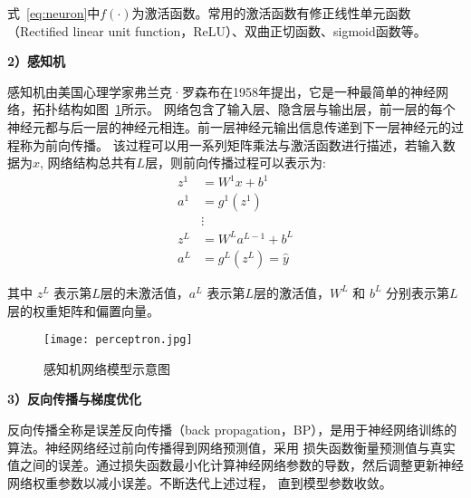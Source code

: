 式~\ref{eq:neuron}中$f(\cdot)$为激活函数。常用的激活函数有修正线性单元函数（Rectified linear unit function，ReLU）、双曲正切函数、sigmoid函数等。

\textbf{2）感知机}

感知机由美国心理学家弗兰克·罗森布\cite{1958perceptron}在1958年提出，它是一种最简单的神经网络，拓扑结构如图~\ref{fig:perceptron}所示。
网络包含了输入层、隐含层与输出层，前一层的每个神经元都与后一层的神经元相连。前一层神经元输出信息传递到下一层神经元的过程称为前向传播。
该过程可以用一系列矩阵乘法与激活函数进行描述，若输入数据为$x$, 网络结构总共有$L$层，则前向传播过程可以表示为:
\begin{equation}
  \begin{aligned}
  z^{1} & =W^{1} x+b^{1} \\
  a^{1} & =g^{1}\left(z^{1}\right) \\
  & \vdots \\
  z^{L} & =W^{L} a^{L-1}+b^{L} \\
  a^{L} & =g^{L}\left(z^{L}\right)=\hat{y}
  \label{eq:perceptron}
\end{aligned}
\end{equation}

其中 $z^{L}$ 表示第$L$层的未激活值，$a^{L}$ 表示第$L$层的激活值，$W^{L}$ 和 $b^{L}$ 分别表示第$L$层的权重矩阵和偏置向量。
\begin{figure}[htbp]
  \centering
  \texttt{[image: perceptron.jpg]}
  \caption{感知机网络模型示意图}
  \label{fig:perceptron}
\end{figure}

\textbf{3）反向传播与梯度优化}

反向传播全称是误差反向传播（back propagation，BP），是用于神经网络训练的算法。神经网络经过前向传播得到网络预测值，采用
损失函数衡量预测值与真实值之间的误差。通过损失函数最小化计算神经网络参数的导数，然后调整更新神经网络权重参数以减小误差。不断迭代上述过程，
直到模型参数收敛。

